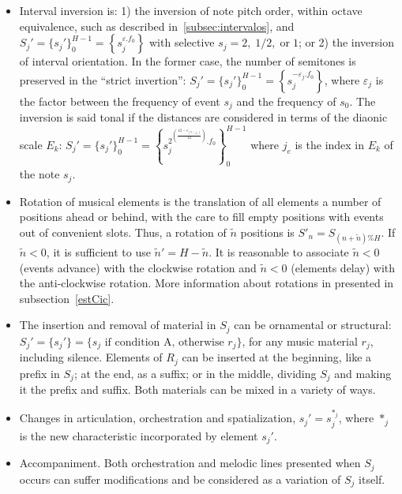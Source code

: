 \begin{itemize}
        \item Interval inversion is: 1) the inversion of note pitch order, within octave equivalence, such as described in~\ref{subsec:intervalos}, and $S_j'=\{s_j'\}_0^{H-1}=\left\{s_j^{\varepsilon. f_0}\right\}$ with selective $s_j=2,\;1/2,\;\text{or}\;1$; or 2) the inversion of interval orientation. In the former case, the number of semitones
        is preserved in the ``strict invertion'':
        $S_j'=\{s_j'\}_0^{H-1}=\left\{s_j^{-\varepsilon_j . f_0}\right\}$, where
        $\varepsilon_j$ is the factor between the frequency of event $s_j$ and the
        frequency of $s_0$. The inversion is said tonal if the distances are
        considered in terms of the diaonic scale $E_k$:
        $S_j'=\{s_j'\}_0^{H-1}=\left\{s_j^{2^{\left(\frac{12-e_{\left(7-j_e\right)}}{12}\right)}
        . f_0}\right\}_0^{H-1}$ where $j_e$ is the index in
        $E_k$ of the note $s_j$. 

        \item Rotation of musical elements is the translation of all elements
        a number of positions ahead or behind, with the care to fill empty positions
        with events out of convenient slots. Thus, a
        rotation of $\tilde{n}$ positions is $S'_n=S_{(n+\tilde{n})\%H}$. If
        $\tilde{n}<0$, it is sufficient to use $\tilde{n}'=H-\tilde{n}$. It is
        reasonable to associate $\tilde{n}<0$ (events advance) with the clockwise rotation and
        $\tilde{n}<0$ (elements delay) with the anti-clockwise rotation. 
        More information about rotations in presented in subsection~\ref{estCic}.

        \item The insertion and removal of material in $S_j$ can be
    ornamental or structural: $S_j'=\{s_j'\}=\{s_j \text{ if condition A,
    otherwise } r_j\}$, for any music material $r_j$, including silence.
    Elements of $R_j$ can be inserted at the beginning, like a prefix
    in $S_j$; at the end, as a suffix; or in the middle, dividing $S_j$ and making
    it the prefix and suffix. Both materials can be mixed in a variety of ways.

    \item Changes in articulation, orchestration and spatialization, 
    $s_j'=s_j^{*_j}$, where $*_j$ is the new characteristic incorporated by 
    element $s_j'$.
    
    \item Accompaniment. Both orchestration and melodic lines presented when $S_j$ occurs can suffer modifications and be considered as a variation of $S_j$ itself.
\end{itemize}


